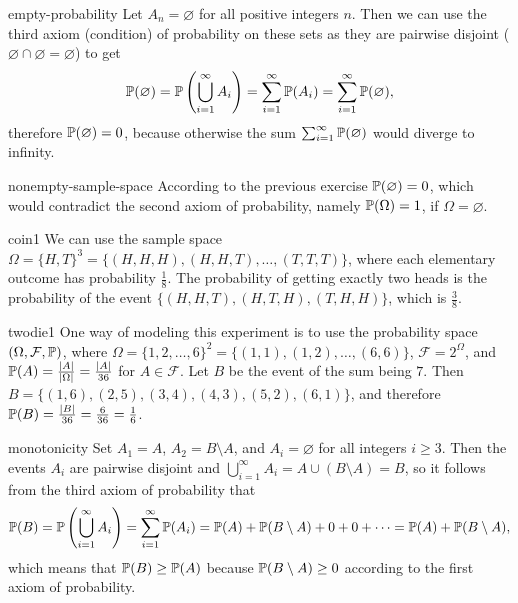 \begin{sol}{empty-probability}
    Let $A_n=\varnothing$ for all positive integers $n$. Then we can use the third axiom (condition) of probability on these sets as they are pairwise disjoint ($\varnothing\cap\varnothing=\varnothing$) to get
    \[
        \mathbb{P}(\varnothing)=\mathbb{P}\left(\bigcup_{i=1}^{\infty}A_i\right)=\sum_{i=1}^{\infty}\mathbb{P}(A_i)=\sum_{i=1}^{\infty}\mathbb{P}(\varnothing),
    \]
    therefore $\mathbb{P}(\varnothing)=0$, because otherwise the sum $\sum_{i=1}^{\infty}\mathbb{P}(\varnothing)$ would diverge to infinity.
\end{sol}

\begin{sol}{nonempty-sample-space}
    According to the previous exercise $\mathbb{P}(\varnothing)=0$, which would contradict the second axiom of probability, namely $\mathbb{P}(\Omega)=1$, if $\Omega=\varnothing$.
\end{sol}

\begin{sol}{coin1}
    We can use the sample space $\Omega=\{H,T\}^3=\{(H,H,H),(H,H,T),\ldots,(T,T,T)\}$, where each elementary outcome has probability $\frac18$. The probability of getting exactly two heads is the probability of the event $\{(H,H,T),(H,T,H),(T,H,H)\}$, which is $\frac38$.
\end{sol}

\begin{sol}{twodie1}
    One way of modeling this experiment is to use the probability space $(\Omega,\mathcal{F},\mathbb{P})$, where $\Omega=\{1,2,\ldots,6\}^2=\{(1,1),(1,2),\ldots,(6,6)\}$, $\mathcal{F}=2^\Omega$, and $\mathbb{P}(A)=\frac{|A|}{|\Omega|}=\frac{|A|}{36}$ for $A\in\mathcal{F}$. Let $B$ be the event of the sum being $7$. Then $B=\{(1,6),(2,5),(3,4),(4,3),(5,2),(6,1)\}$, and therefore $\mathbb{P}(B)=\frac{|B|}{36}=\frac{6}{36}=\frac{1}{6}$.
\end{sol}

\begin{sol}{monotonicity}
    Set $A_1=A$, $A_2=B\setminus A$, and $A_i=\varnothing$ for all integers $i\ge3$. Then the events $A_i$ are pairwise disjoint and $\bigcup_{i=1}^{\infty}A_i=A\cup(B\setminus A)=B$, so it follows from the third axiom of probability that
    \[
        \mathbb{P}(B)=\mathbb{P}\left(\bigcup_{i=1}^{\infty}A_i\right)=\sum_{i=1}^{\infty}\mathbb{P}(A_i)=\mathbb{P}(A)+\mathbb{P}(B\setminus A)+0+0+\cdots=\mathbb{P}(A)+\mathbb{P}(B\setminus A),
    \]
    which means that $\mathbb{P}(B)\ge\mathbb{P}(A)$ because $\mathbb{P}(B\setminus A)\ge0$ according to the first axiom of probability.
\end{sol}

